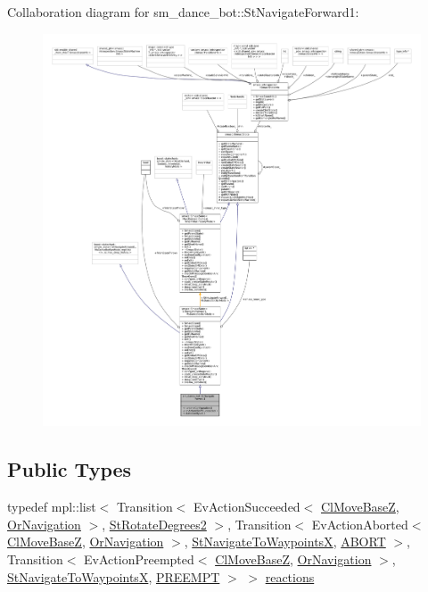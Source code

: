 Collaboration diagram for sm\+\_\+dance\+\_\+bot\+:\+:St\+Navigate\+Forward1\+:
\nopagebreak
\begin{figure}[H]
\begin{center}
\leavevmode
\includegraphics[width=350pt]{structsm__dance__bot_1_1StNavigateForward1__coll__graph}
\end{center}
\end{figure}
\subsection*{Public Types}
\begin{DoxyCompactItemize}
\item 
typedef mpl\+::list$<$ Transition$<$ Ev\+Action\+Succeeded$<$ \hyperlink{classmove__base__z__client_1_1ClMoveBaseZ}{Cl\+Move\+BaseZ}, \hyperlink{classsm__dance__bot_1_1OrNavigation}{Or\+Navigation} $>$, \hyperlink{structsm__dance__bot_1_1StRotateDegrees2}{St\+Rotate\+Degrees2} $>$, Transition$<$ Ev\+Action\+Aborted$<$ \hyperlink{classmove__base__z__client_1_1ClMoveBaseZ}{Cl\+Move\+BaseZ}, \hyperlink{classsm__dance__bot_1_1OrNavigation}{Or\+Navigation} $>$, \hyperlink{structsm__dance__bot_1_1StNavigateToWaypointsX}{St\+Navigate\+To\+WaypointsX}, \hyperlink{classABORT}{A\+B\+O\+RT} $>$, Transition$<$ Ev\+Action\+Preempted$<$ \hyperlink{classmove__base__z__client_1_1ClMoveBaseZ}{Cl\+Move\+BaseZ}, \hyperlink{classsm__dance__bot_1_1OrNavigation}{Or\+Navigation} $>$, \hyperlink{structsm__dance__bot_1_1StNavigateToWaypointsX}{St\+Navigate\+To\+WaypointsX}, \hyperlink{classPREEMPT}{P\+R\+E\+E\+M\+PT} $>$ $>$ \hyperlink{structsm__dance__bot_1_1StNavigateForward1_a4a49d0c774d44f96b17ceac4c6628104}{reactions}
\end{DoxyCompactItemize}
